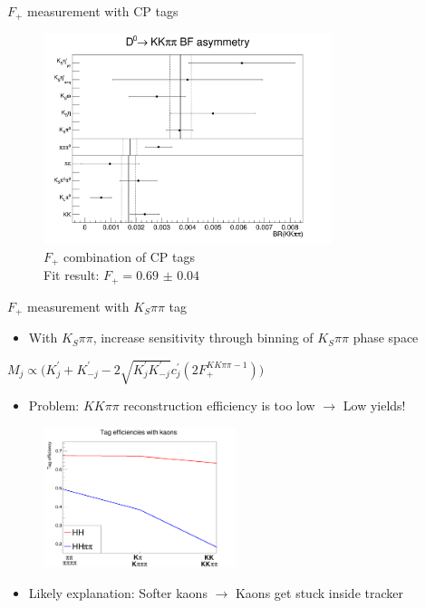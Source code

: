 \documentclass{beamer}
\begin{document}
\begin{frame}{$F_+$ measurement with CP tags}
  \begin{figure}
    \centering
    \includegraphics[width=0.75\textwidth]{Plots/CPeven_fraction_combination_CPtags.png}
    \caption{$F_+$ combination of CP tags\\Fit result: $F_+ = \SI{0.69(4)}{}$}
  \end{figure}
\end{frame}

\begin{frame}{$F_+$ measurement with $K_S\pi\pi$ tag}
  \begin{itemize}
    \item{With $K_S\pi\pi$, increase sensitivity through binning of $K_S\pi\pi$ phase space}
  \end{itemize}
  \begin{center}
    $M_j\propto\big(K^\prime_j + K^\prime_{-j} - 2\sqrt{K^\prime_jK^\prime_{-j}}c^\prime_j(2F_+^{KK\pi\pi - 1})\big)$
  \end{center}
  \begin{itemize}
    \item{Problem: $KK\pi\pi$ reconstruction efficiency is too low $\to$ Low yields!}
  \end{itemize}
  \begin{figure}
    \includegraphics[width = 0.5\textwidth]{Plots/KaonTrackingEfficiency.png}
  \end{figure}
  \begin{itemize}
    \item{Likely explanation: Softer kaons $\to$ Kaons get stuck inside tracker}
  \end{itemize}
\end{frame}
\end{document}
